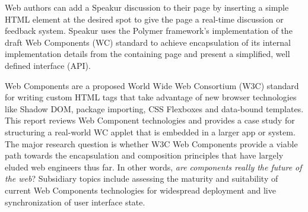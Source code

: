 \documentclass[12pt]{report}	%
\theoremstyle{definition}
\theoremstyle{remark}
\begin{document}
Web authors can add a Speakur discussion to their page by inserting a simple HTML element at the desired spot to give the page a real-time discussion or feedback system.
Speakur uses the Polymer framework's implementation of the draft Web Components (WC) standard to achieve encapsulation of its internal implementation details from the containing page and present a simplified, well defined interface (API).

Web Components are a proposed World Wide Web Consortium (W3C) standard for writing custom HTML tags that take advantage of new browser technologies like Shadow DOM, package importing, CSS Flexboxes and data-bound templates.
This report reviews Web Component technologies and provides a case study for structuring a real-world WC applet that is embedded in a larger app or system.
The major research question is whether W3C Web Components provide a viable path towards the encapsulation and composition principles that have largely eluded web engineers thus far. 
In other words, \textit{are components really the future of the web}? 
Subsidiary topics include assessing the maturity and suitability of current Web Components technologies for widespread deployment and live synchronization of user interface state.


\tableofcontents   %

\listoftables      %
\listoffigures     %
\lstlistoflistings


%
%







\end{document}
